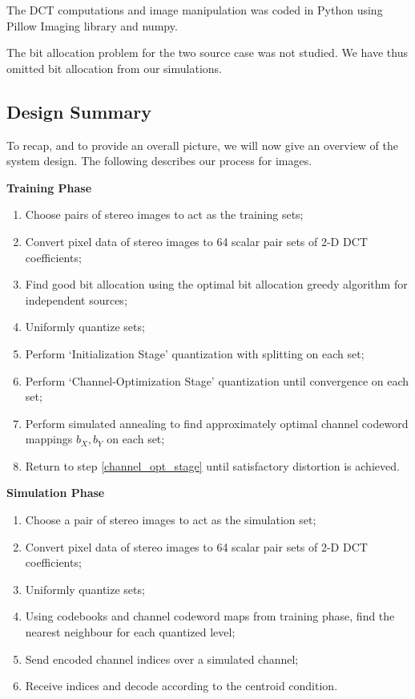 The DCT computations and image manipulation was coded in Python using Pillow Imaging library and numpy.

The bit allocation problem for the two source case was not studied. We have thus omitted bit allocation from our simulations.


\subsection{Design Summary}
To recap, and to provide an overall picture, we will now give an overview of the system design. The following describes our process for images.

\medskip
{\noindent \bf Training Phase}
\begin{enumerate}
    \item Choose pairs of stereo images to act as the training sets;
    \item Convert pixel data of stereo images to 64 scalar pair sets of 2-D DCT coefficients;
    \item Find good bit allocation using the optimal bit allocation greedy algorithm for independent sources;
    \item Uniformly quantize sets;
    \item Perform `Initialization Stage' quantization with splitting on each set;
    \item \label{channel_opt_stage}
    Perform `Channel-Optimization Stage' quantization until convergence on each set;
    \item Perform simulated annealing to find approximately optimal channel codeword mappings $b_X, b_Y$ on each set;
    \item Return to step \ref{channel_opt_stage} until satisfactory distortion is achieved.
\end{enumerate}
\medskip
{\noindent \bf Simulation Phase}
\begin{enumerate}
    \item Choose a pair of stereo images to act as the simulation set;
    \item Convert pixel data of stereo images to 64 scalar pair sets of 2-D DCT coefficients;
    \item Uniformly quantize sets;
    \item Using codebooks and channel codeword maps from training phase, find the nearest neighbour for each quantized level;
    \item Send encoded channel indices over a simulated channel;
    \item Receive indices and decode according to the centroid condition.
\end{enumerate}


